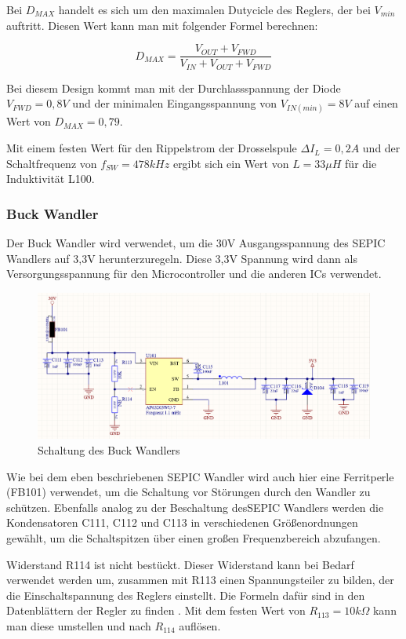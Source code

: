 Bei \(D_{MAX}\) handelt es sich um den maximalen Dutycicle des Reglers, der bei \(V_{min}\) auftritt. Diesen Wert kann man mit
folgender Formel berechnen:

\[D_{MAX} = \frac{V_{OUT} + V_{FWD}}{V_{IN} + V_{OUT} + V_{FWD}}\]

Bei diesem Design kommt man mit der Durchlassspannung der Diode \(V_{FWD} = 0,8V\) und der minimalen Eingangsspannung von
\(V_{IN(min)} = 8V\) auf einen Wert von \(D_{MAX} = 0,79\).

Mit einem festen Wert für den Rippelstrom der Drosselspule \(\Delta I_L = 0,2A\) und der Schaltfrequenz von \(f_{SW} = 478kHz\)
ergibt sich ein Wert von \(L = 33\mu H\) für die Induktivität L100.

\subsubsection{Buck Wandler}
Der Buck Wandler wird verwendet, um die 30V Ausgangsspannung des \ac{SEPIC} Wandlers auf 3,3V herunterzuregeln. Diese 3,3V Spannung
wird dann als Versorgungsspannung für den Microcontroller und die anderen \acp{IC} verwendet.

\begin{figure}[H]
    \centering
    \includegraphics[width=1\textwidth]{resources/images/buck_sp.png}
    \caption[Buck Schaltung]{Schaltung des Buck Wandlers}
    \label{fig:buck_sp}
\end{figure}

Wie bei dem eben beschriebenen \ac{SEPIC} Wandler wird auch hier eine Ferritperle (FB101) verwendet, um die Schaltung vor Störungen
durch den Wandler zu schützen. Ebenfalls analog zu der Beschaltung des\ac{SEPIC} Wandlers werden die Kondensatoren C111, C112 und
C113 in verschiedenen Größenordnungen gewählt, um die Schaltspitzen über einen großen Frequenzbereich abzufangen.

Widerstand R114 ist nicht bestückt. Dieser Widerstand kann bei Bedarf verwendet werden um, zusammen mit R113 einen Spannungsteiler 
zu bilden, der die Einschaltspannung des Reglers einstellt. Die Formeln dafür sind in den Datenblättern der Regler zu finden 
\cite{AP63203WU}. Mit dem festen Wert von \(R_{113} = 10k\Omega\) kann man diese umstellen und nach \(R_{114}\) auflösen.

